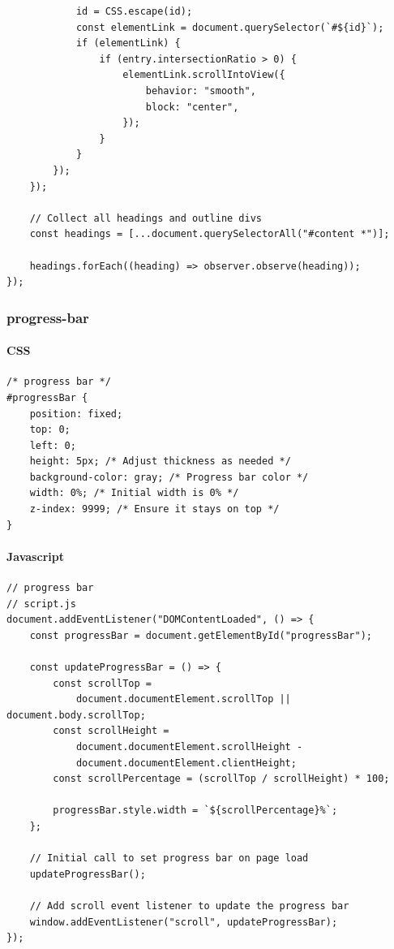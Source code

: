 \documentclass[11pt]{article}
\begin{document}
\begin{verbatim}
            id = CSS.escape(id);
            const elementLink = document.querySelector(`#${id}`);
            if (elementLink) {
                if (entry.intersectionRatio > 0) {
                    elementLink.scrollIntoView({
                        behavior: "smooth",
                        block: "center",
                    });
                }
            }
        });
    });

    // Collect all headings and outline divs
    const headings = [...document.querySelectorAll("#content *")];

    headings.forEach((heading) => observer.observe(heading));
});
\end{verbatim}
\subsubsection{progress-bar}
\label{sec:org2449ce8}
\paragraph{CSS}
\label{sec:orgbe971f9}
\begin{verbatim}
/* progress bar */
#progressBar {
    position: fixed;
    top: 0;
    left: 0;
    height: 5px; /* Adjust thickness as needed */
    background-color: gray; /* Progress bar color */
    width: 0%; /* Initial width is 0% */
    z-index: 9999; /* Ensure it stays on top */
}
\end{verbatim}
\paragraph{Javascript}
\label{sec:org9f55e1c}
\begin{verbatim}
// progress bar
// script.js
document.addEventListener("DOMContentLoaded", () => {
    const progressBar = document.getElementById("progressBar");

    const updateProgressBar = () => {
        const scrollTop =
            document.documentElement.scrollTop || document.body.scrollTop;
        const scrollHeight =
            document.documentElement.scrollHeight -
            document.documentElement.clientHeight;
        const scrollPercentage = (scrollTop / scrollHeight) * 100;

        progressBar.style.width = `${scrollPercentage}%`;
    };

    // Initial call to set progress bar on page load
    updateProgressBar();

    // Add scroll event listener to update the progress bar
    window.addEventListener("scroll", updateProgressBar);
});
\end{verbatim}
\end{document}

